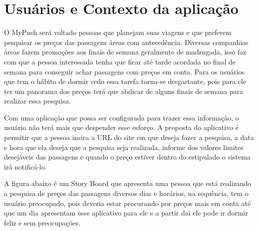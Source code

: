 \chapter[Usuários e Contexto da aplicação]{Usuários e Contexto da aplicação}

O MyPush será voltado pessoas que planejam suas viagens e que preferem pesquisar os preços das passagens áreas com antecedência. Diversas companhias áreas fazem promoções aos finais de semana geralmente de madrugada, isso faz com que a pessoa interessada tenha que ficar até tarde acordada no final de semana para conseguir achar passagens com preços em conta. Para os usuários que tem o hábito de dormir cedo essa tarefa torna-se desgastante, pois para ele ter um panorama dos preços terá que abdicar de alguns finais de semana para realizar essa pesquisa. 

Com uma aplicação que possa ser configurada para trazer essa informação, o usuário não terá mais que  despender esse esforço. A proposta do aplicativo é permitir que a pessoa insira a URL do site em que deseja fazer a pesquisa, a data e hora que ela deseja que a pesquisa seja realizada, informe dos valores limites desejáveis das passagens e quando o preço estiver dentro do estipulado o sistema irá notificá-lo. 

A figura abaixo é um Story Board que apresenta uma pessoa que está realizando a pesquisa de preços das passagens diversos  dias e horários, na sequência, tem o usuário preocupado, pois deveria estar procurando por preços mais em conta até que um dia apresentam esse aplicativo para ele e a partir dai ele pode ir dormir feliz e sem preocupações.

